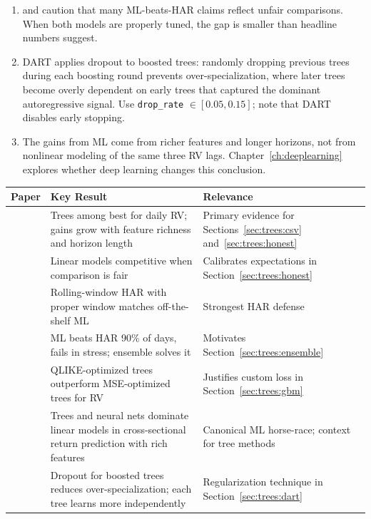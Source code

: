 \begin{enumerate}[leftmargin=1.8em]
\item \citet{BrancoRubesamZevallos2024} and \citet{HARdToBeat2024} caution
  that many ML-beats-HAR claims reflect unfair comparisons.  When both
  models are properly tuned, the gap is smaller than headline numbers
  suggest.

\item DART \citep{VinayakGilad2015} applies dropout to boosted trees:
  randomly dropping previous trees during each boosting round prevents
  over-specialization, where later trees become overly dependent on early
  trees that captured the dominant autoregressive signal.  Use
  \texttt{drop\_rate} $\in [0.05, 0.15]$; note that DART disables early
  stopping.

\item The gains from ML come from richer features and longer horizons, not
  from nonlinear modeling of the same three RV lags.  Chapter~\ref{ch:deeplearning}
  explores whether deep learning changes this conclusion.
\end{enumerate}

\bigskip

\begin{center}
\renewcommand{\arraystretch}{1.3}
\begin{tabular}{@{}p{4.5cm}p{6cm}p{4cm}@{}}
\toprule
\textbf{Paper} & \textbf{Key Result} & \textbf{Relevance} \\
\midrule
\citet{ChristensenSiggaardVeliyev2023}
  & Trees among best for daily RV; gains grow with feature richness and
    horizon length
  & Primary evidence for Sections~\ref{sec:trees:csv}
    and~\ref{sec:trees:honest} \\
\citet{BrancoRubesamZevallos2024}
  & Linear models competitive when comparison is fair
  & Calibrates expectations in Section~\ref{sec:trees:honest} \\
\citet{HARdToBeat2024}
  & Rolling-window HAR with proper window matches off-the-shelf ML
  & Strongest HAR defense \\
\citet{RahimikiaPoon2020}
  & ML beats HAR 90\% of days, fails in stress; ensemble solves it
  & Motivates Section~\ref{sec:trees:ensemble} \\
\citet{AudrinoKnaus2016}
  & QLIKE-optimized trees outperform MSE-optimized trees for RV
  & Justifies custom loss in Section~\ref{sec:trees:gbm} \\
\citet{GuKellyXiu2020}
  & Trees and neural nets dominate linear models in cross-sectional return
    prediction with rich features
  & Canonical ML horse-race; context for tree methods \\
\citet{VinayakGilad2015}
  & Dropout for boosted trees reduces over-specialization; each tree learns
    more independently
  & Regularization technique in Section~\ref{sec:trees:dart} \\
\bottomrule
\end{tabular}
\end{center}
